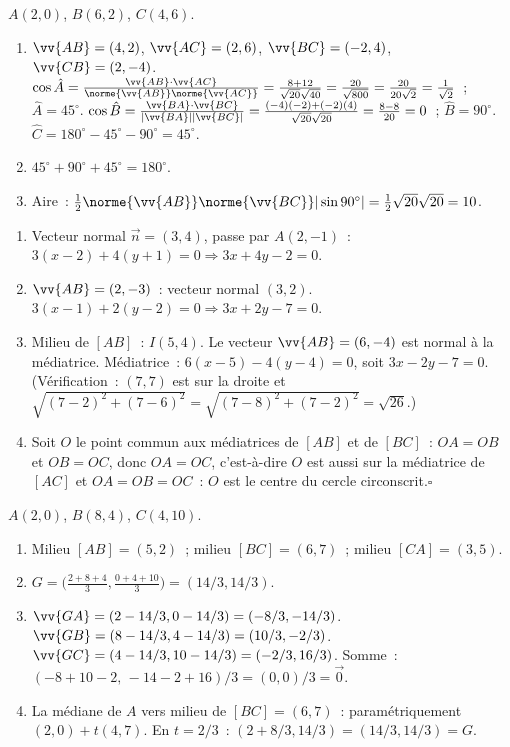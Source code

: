 
$A(2,0)$, $B(6,2)$, $C(4,6)$.
\begin{enumerate}
  \item $\vv{AB}=(4,2)$, $\vv{AC}=(2,6)$, $\vv{BC}=(-2,4)$, $\vv{CB}=(2,-4)$.
        $\cos\hat{A}=\frac{\vv{AB}\cdot\vv{AC}}{\norme{\vv{AB}}\norme{\vv{AC}}}
        =\frac{8+12}{\sqrt{20}\sqrt{40}}=\frac{20}{\sqrt{800}}=\frac{20}{20\sqrt{2}}=\frac{1}{\sqrt{2}}$~; $\hat{A}=45^{\circ}$.
        $\cos\hat{B}=\frac{\vv{BA}\cdot\vv{BC}}{|\vv{BA}||\vv{BC}|}
        =\frac{(-4)(-2)+(-2)(4)}{\sqrt{20}\sqrt{20}}=\frac{8-8}{20}=0$~; $\hat{B}=90^{\circ}$.
        $\hat{C}=180^{\circ}-45^{\circ}-90^{\circ}=45^{\circ}$.
  \item $45^{\circ}+90^{\circ}+45^{\circ}=180^{\circ}$.\checkmark
  \item Aire~: $\frac{1}{2}\norme{\vv{AB}}\norme{\vv{BC}}|\sin90^{\circ}|
        =\frac{1}{2}\sqrt{20}\sqrt{20}=10$.
\end{enumerate}


\begin{enumerate}
  \item Vecteur normal $\vec{n}=(3,4)$, passe par $A(2,-1)$~:
        $3(x-2)+4(y+1)=0\Rightarrow3x+4y-2=0$.
  \item $\vv{AB}=(2,-3)$~: vecteur normal $(3,2)$.
        $3(x-1)+2(y-2)=0\Rightarrow3x+2y-7=0$.
  \item Milieu de $[AB]$~: $I(5,4)$. Le vecteur $\vv{AB}=(6,-4)$ est normal \`a la m\'ediatrice.
        M\'ediatrice~: $6(x-5)-4(y-4)=0$, soit $3x-2y-7=0$.
        (V\'erification~: $(7,7)$ est sur la droite et $\sqrt{(7-2)^2+(7-6)^2}=\sqrt{(7-8)^2+(7-2)^2}=\sqrt{26}$.)
  \item Soit $O$ le point commun aux m\'ediatrices de $[AB]$ et de $[BC]$~: $OA=OB$ et $OB=OC$, donc $OA=OC$,
        c'est-\`a-dire $O$ est aussi sur la m\'ediatrice de $[AC]$ et $OA=OB=OC$~: $O$ est le centre du cercle circonscrit.\hfill$\square$
\end{enumerate}


$A(2,0)$, $B(8,4)$, $C(4,10)$.
\begin{enumerate}
  \item Milieu $[AB]=(5,2)$~; milieu $[BC]=(6,7)$~; milieu $[CA]=(3,5)$.
  \item $G=\bigl(\tfrac{2+8+4}{3},\tfrac{0+4+10}{3}\bigr)=(14/3,14/3)$.
  \item $\vv{GA}=(2-14/3,0-14/3)=(-8/3,-14/3)$.
        $\vv{GB}=(8-14/3,4-14/3)=(10/3,-2/3)$.
        $\vv{GC}=(4-14/3,10-14/3)=(-2/3,16/3)$.
        Somme~: $(-8+10-2,\,-14-2+16)/3=(0,0)/3=\vec{0}$.\checkmark
  \item La m\'ediane de $A$ vers milieu de $[BC]=(6,7)$~:
        param\'etriquement $(2,0)+t(4,7)$. En $t=2/3$~: $(2+8/3,14/3)=(14/3,14/3)=G$.\checkmark
\end{enumerate}

